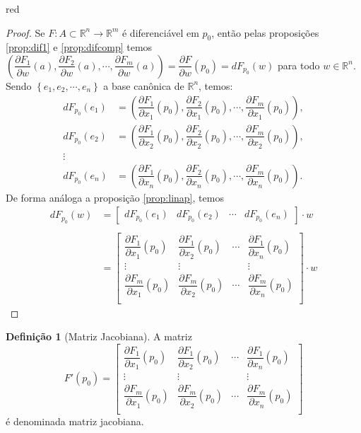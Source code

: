 \documentclass[12pt,leqno,twoside]{amsart}
\theoremstyle{definition}
\newtheorem{definicao}{Definição}[section]
\begin{document}
\begin{color}{red}
\begin{proof}
	Se $F:A\subset \mathbb{R}^n \to \mathbb{R}^m$ é diferenciável em $p_0$, então pelas proposições \ref{prop:dif1} e \ref{prop:difcomp} temos $\left( \dfrac{\partial F_1}{\partial w} (a), \dfrac{\partial F_2}{\partial w} (a), \cdots, \dfrac{\partial F_m}{\partial w} (a) \right) =  \dfrac{\partial F}{\partial w} (p_0)  =  dF_{p_0}(w)$ para todo $w \in \mathbb{R}^n$.  Sendo $\left\{e_1,e_2,\cdots, e_n\right\}$ a base canônica de $\mathbb{R}^n$, temos:
	\begin{align*}
		dF_{p_0}(e_1) &= \left( \dfrac{\partial F_1}{\partial x_1} (p_0), \dfrac{\partial F_2}{\partial x_1} (p_0), \cdots, \dfrac{\partial F_m}{\partial x_1} (p_0) \right),\\
		dF_{p_0}(e_2) &= \left( \dfrac{\partial F_1}{\partial x_2} (p_0), \dfrac{\partial F_2}{\partial x_2} (p_0), \cdots, \dfrac{\partial F_m}{\partial x_2} (p_0) \right),\\
		\vdots \\
		dF_{p_0}(e_n) &= \left( \dfrac{\partial F_1}{\partial x_n} (p_0), \dfrac{\partial F_2}{\partial x_n} (p_0), \cdots, \dfrac{\partial F_m}{\partial x_n} (p_0) \right).
	\end{align*}
	De forma análoga a proposição \ref{prop:linap}, temos
	\begin{align*}
		dF_{p_0}(w) &= \left[\begin{array}{cccc} dF_{p_0}(e_1)& dF_{p_0}(e_2)& \cdots& dF_{p_0}(e_n)  \end{array} \right]\cdot w \\~\\
			&= \left[\begin{array}{cccc} \dfrac{\partial F_1}{\partial x_1} (p_0)& \dfrac{\partial F_1}{\partial x_2} (p_0)& \cdots& \dfrac{\partial F_1}{\partial x_n} (p_0) \\  \vdots &\vdots&&\vdots\\ \dfrac{\partial F_m}{\partial x_1} (p_0)& \dfrac{\partial F_m}{\partial x_2} (p_0)& \cdots& \dfrac{\partial F_m}{\partial x_n} (p_0) \\  \end{array}\right] \cdot w
	\end{align*}
\end{proof}

\vspace{0.3cm}

\begin{definicao}[Matriz Jacobiana]
	A matriz $$F'(p_0) = \left[\begin{array}{cccc} \dfrac{\partial F_1}{\partial x_1} (p_0)& \dfrac{\partial F_1}{\partial x_2} (p_0)& \cdots& \dfrac{\partial F_1}{\partial x_n} (p_0) \\  \vdots &\vdots&&\vdots\\ \dfrac{\partial F_m}{\partial x_1} (p_0)& \dfrac{\partial F_m}{\partial x_2} (p_0)& \cdots& \dfrac{\partial F_m}{\partial x_n} (p_0) \\  \end{array}\right]$$
		é denominada matriz jacobiana.


\end{definicao}
\end{color}
\end{document}
